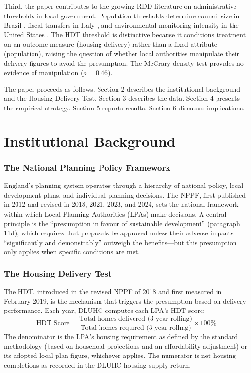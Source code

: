 \documentclass[12pt]{article}
\begin{document}
Third, the paper contributes to the growing RDD literature on administrative thresholds in local government. Population thresholds determine council size in Brazil \citep{brollo2013}, fiscal transfers in Italy \citep{gagliarducci2011}, and environmental monitoring intensity in the United States \citep{greenstone2012}. The HDT threshold is distinctive because it conditions treatment on an outcome measure (housing delivery) rather than a fixed attribute (population), raising the question of whether local authorities manipulate their delivery figures to avoid the presumption. The McCrary density test provides no evidence of manipulation ($p = 0.46$).

The paper proceeds as follows. Section 2 describes the institutional background and the Housing Delivery Test. Section 3 describes the data. Section 4 presents the empirical strategy. Section 5 reports results. Section 6 discusses implications.


\section{Institutional Background}

\subsubsection*{The National Planning Policy Framework} England's planning system operates through a hierarchy of national policy, local development plans, and individual planning decisions. The NPPF, first published in 2012 and revised in 2018, 2021, 2023, and 2024, sets the national framework within which Local Planning Authorities (LPAs) make decisions. A central principle is the ``presumption in favour of sustainable development'' (paragraph 11d), which requires that proposals be approved unless their adverse impacts ``significantly and demonstrably'' outweigh the benefits---but this presumption only applies when specific conditions are met.

\subsubsection*{The Housing Delivery Test} The HDT, introduced in the revised NPPF of 2018 and first measured in February 2019, is the mechanism that triggers the presumption based on delivery performance. Each year, DLUHC computes each LPA's HDT score:
\begin{equation}
\text{HDT Score} = \frac{\text{Total homes delivered (3-year rolling)}}{\text{Total homes required (3-year rolling)}} \times 100\%
\end{equation}
The denominator is the LPA's housing requirement as defined by the standard methodology (based on household projections and an affordability adjustment) or its adopted local plan figure, whichever applies. The numerator is net housing completions as recorded in the DLUHC housing supply return.
\end{document}
